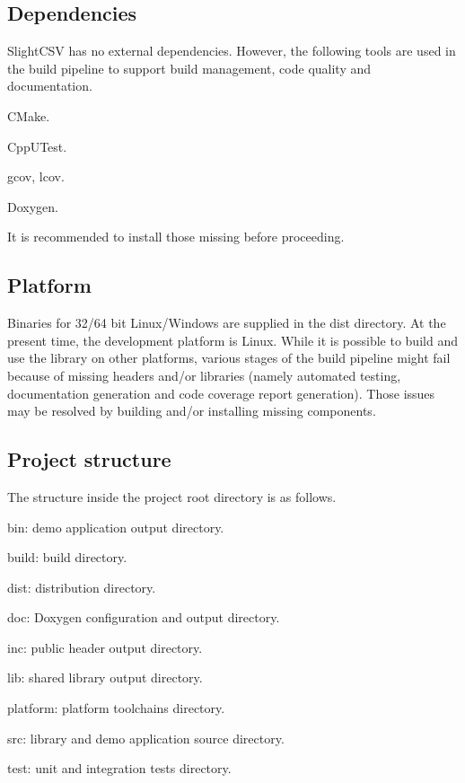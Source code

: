 \subsection*{Dependencies}

Slight\+C\+SV has no external dependencies. However, the following tools are used in the build pipeline to support build management, code quality and documentation.


\begin{DoxyItemize}
\item C\+Make.
\item Cpp\+U\+Test.
\item gcov, lcov.
\item Doxygen.
\end{DoxyItemize}

It is recommended to install those missing before proceeding.

\subsection*{Platform}

Binaries for 32/64 bit Linux/\+Windows are supplied in the dist directory. At the present time, the development platform is Linux. While it is possible to build and use the library on other platforms, various stages of the build pipeline might fail because of missing headers and/or libraries (namely automated testing, documentation generation and code coverage report generation). Those issues may be resolved by building and/or installing missing components.

\subsection*{Project structure}

The structure inside the project root directory is as follows.


\begin{DoxyItemize}
\item bin\+: demo application output directory.
\item build\+: build directory.
\item dist\+: distribution directory.
\item doc\+: Doxygen configuration and output directory.
\item inc\+: public header output directory.
\item lib\+: shared library output directory.
\item platform\+: platform toolchains directory.
\item src\+: library and demo application source directory.
\item test\+: unit and integration tests directory.
\end{DoxyItemize}

